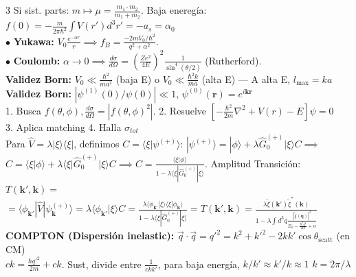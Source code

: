 \documentclass[8pt,a4paper,fleqn]{extarticle} %
\begin{document}
\begin{multicols}{3}
Si sist. parts: $m \mapsto \mu = \frac{m_1 \cdot m_2}{m_1+m_2}$. Baja eneregía: $f(0)=-\frac
{m}{2\pi \hbar^2}\int V(r')d^3r'=-a_s=\alpha_0$\\
$\bullet$ \textbf{Yukawa:} $V_0 \frac{e^{-\alpha r}}{r} \implies f_B = \frac{-2mV_0/\hbar^2}{q^2 + \alpha^2}$.\\
$\bullet$ \textbf{Coulomb:} $\alpha \to 0 \implies \frac{d\sigma}{d\Omega} = \left(\frac{Ze^2}{4E}\right)^2 \frac{1}{\sin^4(\theta/2)}$ (Rutherford).\\
\textbf{Validez Born:} $V_0 \ll \frac{\hbar^2}{ma^2}$ (baja E) o $V_0 \ll \frac{\hbar^2 k}{ma}$ (alta E) --- A alta E, $l_{\max}= ka$ \\
\textbf{Validez Born:} $|\psi^{(1)}(0)/\psi(0)|\ll 1$, $\psi^{(0)}(\mathbf{r}) = e^{i \mathbf{kr}}$\\
1. Busca $f(\theta, \phi), \tfrac{d\sigma}{d\Omega} = |f(\theta,\phi)^2|$. 2. Resuelve $[-\tfrac{\hbar^2}{2m}\nabla^2 + V(r)-E]\psi =0$ \\3. Aplica matching 4. Halla $\sigma_{tot}$\\
Para $\hat{V} = \lambda |\xi\rangle \langle\xi|$, definimos $C = \langle\xi|\psi^{(+)}\rangle$: $|\psi^{(+)}\rangle = |\phi\rangle + \lambda \hat{G}_0^{(+)} |\xi\rangle C \implies$ $ C = \langle\xi|\phi\rangle + \lambda \langle\xi|\hat{G}_0^{(+)}|\xi\rangle C \implies C = \frac{\langle\xi|\phi\rangle}{1 - \lambda \langle\xi|\hat{G}_0^{(+)}|\xi\rangle}$. Amplitud Transición: $T(\mathbf{k}', \mathbf{k})= $ \\$= \langle\phi_{\mathbf{k}'}|\hat{V}|\psi_{\mathbf{k}}^{(+)}\rangle = \lambda \langle\phi_{\mathbf{k}'}|\xi\rangle C = \frac{\lambda \langle\phi_{\mathbf{k}'}|\xi\rangle \langle\xi|\phi_{\mathbf{k}}\rangle}{1 - \lambda \langle\xi|\hat{G}_0^{(+)}|\xi\rangle}=$$T(\mathbf{k}', \mathbf{k}) = \frac{\lambda \tilde{\xi}(\mathbf{k}') \tilde{\xi}^*(\mathbf{k})}{1 - \lambda \int d^3q \frac{|\tilde{\xi}(\mathbf{q})|^2}{E_k - \frac{\hbar^2 q^2}{2m} + i\epsilon}}$\\
\textbf{COMPTON (Dispersión inelastic):} $\vec{q}\cdot\vec{q} = q'^2 = k^2+k'^2 -2kk'\cos\theta_{\text{scatt}}$ (en CM)\\
$ck= \frac{\hbar q'^2}{2m} + ck$. Sust, divide entre $\tfrac{1}{ckk'}$, para baja energía, $k/k' \approx k'/k \approx 1$\;\;\; $k=2\pi /\lambda$




\end{multicols}
\end{document}
